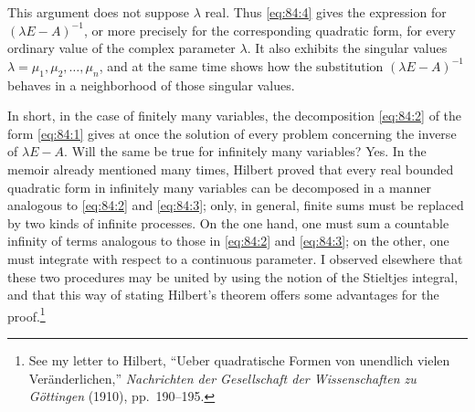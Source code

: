 \documentclass[
  paper=b5,
  fontsize=13pt,
  twoside=true,
  open=any,
  bookmarkpackage=false,
  chapterprefix=true,
  headings=normal
]{scrbook}
\theoremstyle{definition}
\begin{document}
This argument does not suppose \(\lambda\) real.  Thus \eqref{eq:84:4} gives
the expression for \((\lambda E-A)^{-1}\), or more precisely for the
corresponding quadratic form, for every ordinary value of the complex parameter
\(\lambda\).  It also exhibits the singular values
\(\lambda=\mu_1,\mu_2,\ldots,\mu_n\), and at the same time shows how the
substitution \((\lambda E-A)^{-1}\) behaves in a neighborhood of those singular
values.

In short, in the case of finitely many variables, the decomposition
\eqref{eq:84:2} of the form \eqref{eq:84:1} gives at once the solution of every
problem concerning the inverse of \(\lambda E-A\).  Will the same be true for
infinitely many variables?  Yes.  In the memoir already mentioned many times,
Hilbert proved that every real bounded quadratic form in infinitely many
variables can be decomposed in a manner analogous to \eqref{eq:84:2} and
\eqref{eq:84:3}; only, in general, finite sums must be replaced by two kinds of
infinite processes.  On the one hand, one must sum a countable infinity of terms
analogous to those in \eqref{eq:84:2} and \eqref{eq:84:3}; on the other, one
must integrate with respect to a continuous parameter.  I observed elsewhere
that these two procedures may be united by using the notion of the Stieltjes
integral, and that this way of stating Hilbert's theorem offers some advantages
for the proof.\footnote{\label{fn:riesz-letter-hilbert}See my letter to Hilbert, ``Ueber quadratische Formen von
unendlich vielen Veränderlichen,'' \emph{Nachrichten der Gesellschaft der
Wissenschaften zu Göttingen} (1910), pp.~190--195.}
\end{document}
